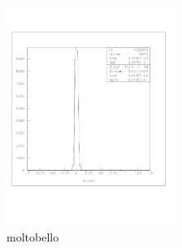 \documentclass[a4paper]{article}
\begin{document}
\begin{figure}[!htb]
  \includegraphics[width=0.49\textwidth]{ex_images/1_010_140_xse.jpg}
  \caption{moltobello}
  \label{fig:010_xse}
\end{figure}
\end{document}
